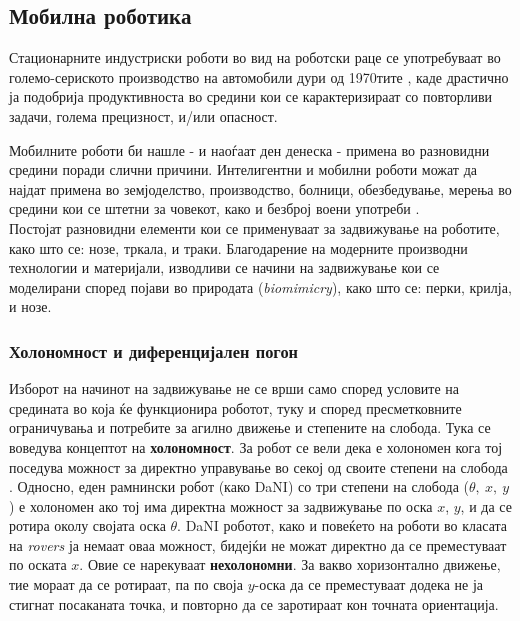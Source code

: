 \documentclass[11pt]{article}
\begin{document}
  \subsection{Мобилна роботика}
    Стационарните индустриски роботи во вид на роботски раце се употребуваат во големо-сериското производство на автомобили дури од 1970тите \cite{robothistory}, каде драстично ја подобрија продуктивноста во средини кои се карактеризираат со повторливи задачи, голема прецизност, и/или опасност.

    \bigbreak
    Мобилните роботи би нашле - и наоѓаат ден денеска - примена во разновидни средини поради слични причини. Интелигентни и мобилни роботи можат да најдат примена во земјоделство, производство, болници, обезбедување, мерења во средини кои се штетни за човекот, како и безброј воени употреби \cite{robotics}.\\
    Постојат разновидни елементи кои се применуваат за задвижување на роботите, како што се: нозе, тркала, и траки. Благодарение на модерните производни технологии и материјали, изводливи се начини на задвижување кои се моделирани според појави во природата (\textit{biomimicry}), како што се: перки, крилја, и нозе.

    \subsubsection{Холономност и диференцијален погон}
      Изборот на начинот на задвижување не се врши само според условите на средината во која ќе функционира роботот, туку и според пресметковните ограничувања и потребите за агилно движење и степените на слобода. Тука се воведува концептот на \textbf{холономност}. За робот се вели дека е холономен кога тој поседува можност за директно управување во секој од своите степени на слобода \cite{differential_drive_robots}. Односно, еден рамнински робот (како DaNI) со три степени на слобода ($\theta,\ x,\ y$) е холономен ако тој има директна можност за задвижување по оска $x$, $y$, и да се ротира околу својата оска $\theta$. DaNI роботот, како и повеќето на роботи во класата на \textit{rovers} ја немаат оваа можност, бидејќи не можат директно да се преместуваат по оската $x$. Овие се нарекуваат \textbf{нехолономни}. За вакво хоризонтално движење, тие мораат да се ротираат, па по своја $y$-оска да се преместуваат додека не ја стигнат посаканата точка, и повторно да се заротираат кон точната ориентација.
\end{document}
